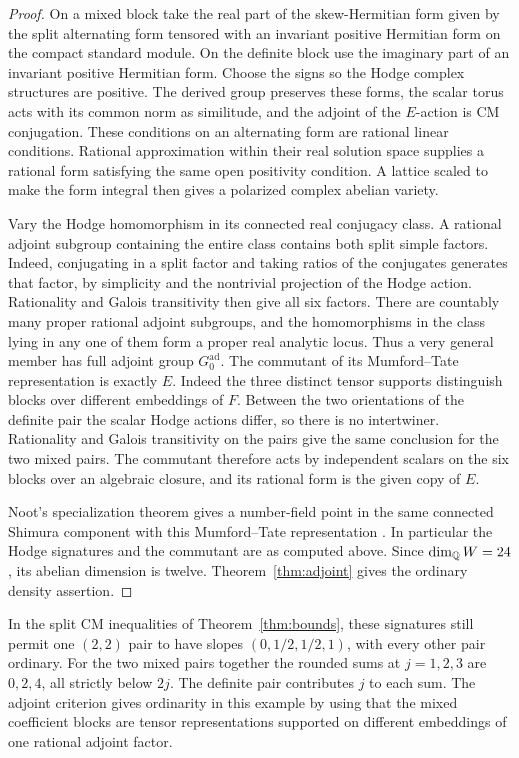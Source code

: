 \begin{proof}
On a mixed block take the real part of the skew-Hermitian form given
by the split alternating form tensored with an invariant positive
Hermitian form on the compact standard module. On the definite block
use the imaginary part of an invariant positive Hermitian form.
Choose the signs so the Hodge complex structures are positive.
The derived group preserves these forms, the scalar torus acts with
its common norm as similitude, and the adjoint of the \(E\)-action is
CM conjugation. These conditions on an alternating form are rational
linear conditions. Rational approximation within their real solution
space supplies a rational form satisfying the same open positivity
condition. A lattice scaled to make the form integral then gives a
polarized complex abelian variety.

Vary the Hodge homomorphism in its connected real conjugacy class.
A rational adjoint subgroup containing the entire class contains
both split simple factors. Indeed, conjugating in a split factor and
taking ratios of the conjugates generates that factor, by simplicity
and the nontrivial projection of the Hodge action. Rationality and
Galois transitivity then give all six factors. There are countably
many proper rational adjoint subgroups, and the homomorphisms in the
class lying in any one of them form a proper real analytic locus.
Thus a very general member has full adjoint group \(G_0^{\mathrm{ad}}\).
The commutant of its Mumford--Tate representation is exactly \(E\).
Indeed the three distinct tensor supports distinguish blocks over
different embeddings of \(F\). Between the two orientations of the
definite pair the scalar Hodge actions differ, so there is no
intertwiner. Rationality and Galois transitivity on the pairs give
the same conclusion for the two mixed pairs. The commutant therefore
acts by independent scalars on the six blocks over an algebraic
closure, and its rational form is the given copy of \(E\).

Noot's specialization theorem gives a number-field point in the same
connected Shimura component with this Mumford--Tate representation
\cite[Theorem~1.7 and its proof]{nootrealization}. In particular the
Hodge signatures and the commutant are as computed above. Since
\(\dim_{\mathbb Q}W=24\), its abelian dimension is twelve. Theorem~\ref{thm:adjoint}
gives the ordinary density assertion.
\end{proof}

In the split CM inequalities of Theorem~\ref{thm:bounds}, these
signatures still permit one \((2,2)\) pair to have slopes
\((0,1/2,1/2,1)\), with every other pair ordinary. For the two mixed
pairs together the rounded sums at \(j=1,2,3\) are \(0,2,4\), all
strictly below \(2j\). The definite pair contributes \(j\) to each
sum. The adjoint criterion gives ordinarity in this example by
using that the mixed coefficient blocks are tensor representations
supported on different embeddings of one rational adjoint factor.
